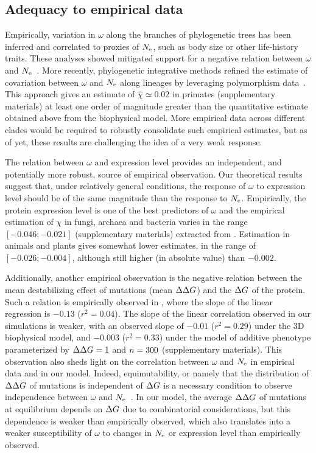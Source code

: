 \documentclass[authoryear]{elsarticle} %
\begin{document}
\subsection{Adequacy to empirical data}
Empirically, variation in $\omega$ along the branches of phylogenetic trees has been inferred and correlated to proxies of $N_{\text{e}}$, such as body size or other life-history traits.
These analyses showed mitigated support for a negative relation between $\omega$ and $N_{\text{e}}$~\citep{Lanfear2014}.
More recently, phylogenetic integrative methods refined the estimate of covariation between $\omega$ and $N_{\text{e}}$ along lineages by leveraging polymorphism data~\citep{Brevet2019}.
This approach gives an estimate of $\hat{\chi} \simeq 0.02$ in primates (supplementary materials) at least one order of magnitude greater than the quantitative estimate obtained above from the biophysical model.
More empirical data across different clades would be required to robustly consolidate such empirical estimates, but as of yet, these results are challenging the idea of a very weak response.

The relation between $\omega$ and expression level provides an independent, and potentially more robust, source of empirical observation.
Our theoretical results suggest that, under relatively general conditions, the response of $\omega$ to expression level should be of the same magnitude than the response to $N_{\text{e}}$.
Empirically, the protein expression level is one of the best predictors of $\omega$ and the empirical estimation of $\chi$ in fungi, archaea and bacteria varies in the range $[-0.046;-0.021]$ (supplementary materials) extracted from \citet{Zhang2015}.
Estimation in animals and plants gives somewhat lower estimates, in the range of $[-0.026;-0.004]$, although still higher (in absolute value) than $-0.002$.

Additionally, another empirical observation is the negative relation between the mean destabilizing effect of mutations (mean $\Delta \Delta G$) and the $\Delta G$ of the protein.
Such a relation is empirically observed in \citet{Serohijos2012}, where the slope of the linear regression is $-0.13$ ($r^2=0.04$).
The slope of the linear correlation observed in our simulations is weaker, with an observed slope of $-0.01$ ($r^2=0.29$) under the 3D biophysical model, and $-0.003$ ($r^2=0.33$) under the model of additive {phenotype} parameterized by $\Delta \Delta G = 1$ and $n=300$ (supplementary materials).
This observation also sheds light on the correlation between $\omega$ and $N_{\text{e}}$ in empirical data and in our model.
Indeed, equimutability, or namely that the distribution of $\Delta \Delta G$ of mutations is independent of $\Delta G$ is a necessary condition to observe independence between $\omega$ and $N_{\text{e}}$~\citep{Cherry1998}.
In our model, the average $\Delta \Delta G$ of mutations at equilibrium depends on $\Delta G$ due to combinatorial considerations, but this dependence is weaker than empirically observed, which also translates into a weaker susceptibility of $\omega$ to changes in $N_{\text{e}}$ or expression level than empirically observed.
\end{document}
